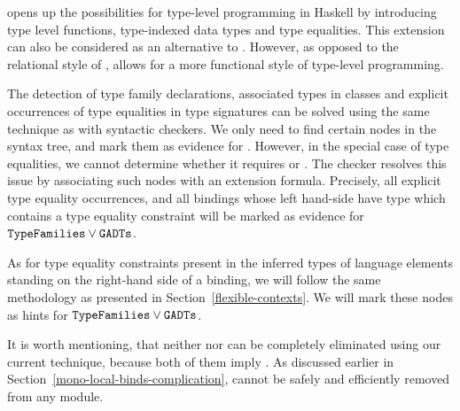 \documentclass[main.tex]{subfiles}
\begin{document}
	
	 opens up the possibilities for type-level programming in Haskell by introducing type level functions, type-indexed data types and type equalities. This extension can also be considered as an alternative to . However, as opposed to the relational style of ,  allows for a more functional style of type-level programming.
	
	The detection of type family declarations, associated types in classes and explicit occurrences of type equalities in type signatures can be solved using the same technique as with syntactic checkers. We only need to find certain nodes in the syntax tree, and mark them as evidence for . However, in the special case of type equalities, we cannot determine whether it requires  or . The checker resolves this issue by associating such nodes with an extension formula. Precisely, all explicit type equality occurrences, and all bindings whose left hand-side have type which contains a type equality constraint will be marked as evidence for $\texttt{TypeFamilies} \lor \texttt{GADTs}$.
	
	As for type equality constraints present in the inferred types of language elements standing on the right-hand side of a binding, we will follow the same methodology as presented in Section~\ref{flexible-contexts}. We will mark these nodes as hints for $\texttt{TypeFamilies} \lor \texttt{GADTs}$.
	
	It is worth mentioning, that neither  nor  can be completely eliminated using our current technique, because both of them imply . As discussed earlier in Section~\ref{mono-local-binds-complication},  cannot be safely and efficiently removed from any module.	
	
\end{document}
